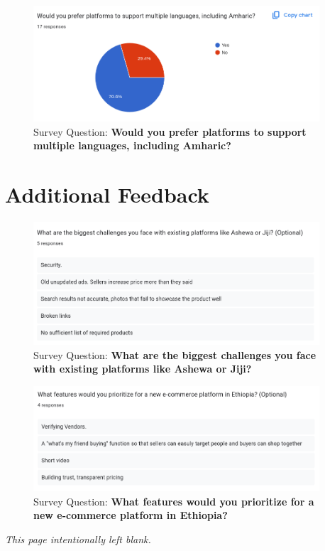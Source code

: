 \documentclass[12pt]{report}
\begin{document}
\begin{appendices}
	\begin{figure}[H]
		\begin{center}
			\includegraphics[width=0.95\textwidth]{survey/q21}
		\end{center}
		\caption{Survey Question: \textbf{Would you prefer platforms to support multiple languages, including Amharic?}}
	\end{figure}

	\section{Additional Feedback}

	\begin{figure}[H]
		\begin{center}
			\includegraphics[width=0.95\textwidth]{survey/q22}
		\end{center}
		\caption{Survey Question: \textbf{What are the biggest challenges you face with existing platforms like Ashewa or Jiji?}}
	\end{figure}

	\begin{figure}[H]
		\begin{center}
			\includegraphics[width=0.95\textwidth]{survey/q23}
		\end{center}
		\caption{Survey Question: \textbf{What features would you prioritize for a new e-commerce platform in Ethiopia?}}
	\end{figure}
\end{appendices}

\newpage
\thispagestyle{empty}
\mbox{}
\vfill
\begin{center}
	\textit{This page intentionally left blank.}
\end{center}
\vfill
\newpage
\end{document}

